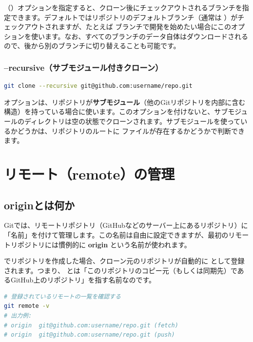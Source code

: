 （）オプションを指定すると、クローン後にチェックアウトされるブランチを指定できます。デフォルトではリポジトリのデフォルトブランチ（通常は ）がチェックアウトされますが、たとえば  ブランチで開発を始めたい場合にこのオプションを使います。なお、すべてのブランチのデータ自体はダウンロードされるので、後から別のブランチに切り替えることも可能です。

\subsubsection{--recursive（サブモジュール付きクローン）}

\begin{lstlisting}[language=bash]
git clone --recursive git@github.com:username/repo.git
\end{lstlisting}

 オプションは、リポジトリが\textbf{サブモジュール}（他のGitリポジトリを内部に含む構造）を持っている場合に使います。このオプションを付けないと、サブモジュールのディレクトリは空の状態でクローンされます。サブモジュールを使っているかどうかは、リポジトリのルートに  ファイルが存在するかどうかで判断できます。

\section{リモート（remote）の管理}

\subsection{originとは何か}

Gitでは、リモートリポジトリ（GitHubなどのサーバー上にあるリポジトリ）に「名前」を付けて管理します。この名前は自由に設定できますが、最初のリモートリポジトリには慣例的に \textbf{origin} という名前が使われます。

 でリポジトリを作成した場合、クローン元のリポジトリが自動的に  として登録されます。つまり、 とは「このリポジトリのコピー元（もしくは同期先）であるGitHub上のリポジトリ」を指す名前なのです。

\begin{lstlisting}[language=bash]
# 登録されているリモートの一覧を確認する
git remote -v
# 出力例:
# origin  git@github.com:username/repo.git (fetch)
# origin  git@github.com:username/repo.git (push)
\end{lstlisting}

